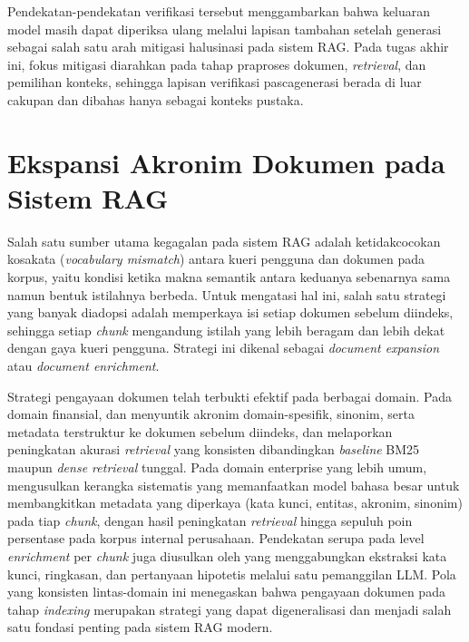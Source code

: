 Pendekatan-pendekatan verifikasi tersebut menggambarkan bahwa keluaran model masih dapat diperiksa ulang melalui lapisan tambahan setelah generasi sebagai salah satu arah mitigasi halusinasi pada sistem RAG. Pada tugas akhir ini, fokus mitigasi diarahkan pada tahap praproses dokumen, \textit{retrieval}, dan pemilihan konteks, sehingga lapisan verifikasi pascagenerasi berada di luar cakupan dan dibahas hanya sebagai konteks pustaka.




\section{Ekspansi Akronim Dokumen pada Sistem RAG}
\label{sec:ekspansi-akronim-rag}

Salah satu sumber utama kegagalan pada sistem RAG adalah ketidakcocokan kosakata (\textit{vocabulary mismatch}) antara kueri pengguna dan dokumen pada korpus, yaitu kondisi ketika makna semantik antara keduanya sebenarnya sama namun bentuk istilahnya berbeda. Untuk mengatasi hal ini, salah satu strategi yang banyak diadopsi adalah memperkaya isi setiap dokumen sebelum diindeks, sehingga setiap \textit{chunk} mengandung istilah yang lebih beragam dan lebih dekat dengan gaya kueri pengguna. Strategi ini dikenal sebagai \textit{document expansion} atau \textit{document enrichment}.

Strategi pengayaan dokumen telah terbukti efektif pada berbagai domain. Pada domain finansial, \textcite{fintechrag2025} dan \textcite{financialmeta2025} menyuntik akronim domain-spesifik, sinonim, serta metadata terstruktur ke dokumen sebelum diindeks, dan melaporkan peningkatan akurasi \textit{retrieval} yang konsisten dibandingkan \textit{baseline} BM25 maupun \textit{dense retrieval} tunggal. Pada domain enterprise yang lebih umum, \textcite{enterprisekg2025} mengusulkan kerangka sistematis yang memanfaatkan model bahasa besar untuk membangkitkan metadata yang diperkaya (kata kunci, entitas, akronim, sinonim) pada tiap \textit{chunk}, dengan hasil peningkatan \textit{retrieval} hingga sepuluh poin persentase pada korpus internal perusahaan. Pendekatan serupa pada level \textit{enrichment} per \textit{chunk} juga diusulkan oleh \textcite{mdkeychunker2025} yang menggabungkan ekstraksi kata kunci, ringkasan, dan pertanyaan hipotetis melalui satu pemanggilan LLM. Pola yang konsisten lintas-domain ini menegaskan bahwa pengayaan dokumen pada tahap \textit{indexing} merupakan strategi yang dapat digeneralisasi dan menjadi salah satu fondasi penting pada sistem RAG modern.

